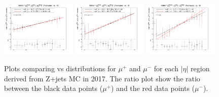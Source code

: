 \begin{figure}[h!]
    \centering
    \includegraphics[width=0.32\textwidth]{images_geofit/muCharge_eta_0_0p9_2017.png}
    \includegraphics[width=0.32\textwidth]{images_geofit/muCharge_eta_0p9_1p7_2017.png}
    \includegraphics[width=0.32\textwidth]{images_geofit/muCharge_eta_1p7_inf_2017.png}
    \caption{Plots comparing \dptoverptsquare vs \dzeroBS distributions for $\mu^+$ and $\mu^-$ for each $|\eta|$ region derived from Z+jets MC in 2017. The ratio plot show the ratio between the black data points ($\mu^+$) and the red data points ($\mu^-$).}
    \label{fig:muCharge_d0_2017}
\end{figure}

